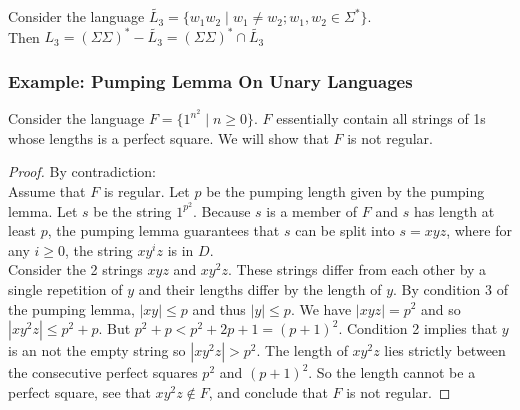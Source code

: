 \documentclass[11pt,a4paper]{article}
\begin{document}
\begin{example}
    Consider the language $\tilde{L_3}=\{w_1w_2\mid w_1\neq w_2;w_1,w_2\in \Sigma^*\}$. \\

    Then $L_3=(\Sigma\Sigma)^*-\tilde{L_3}=(\Sigma\Sigma)^*\cap \tilde{L_3}$
\end{example}

\subsubsection{Example: Pumping Lemma On Unary Languages}
\begin{example}
    Consider the language $F=\{1^{n^2}\mid n\geq 0\}$. $F$ essentially contain all strings of 1s whose lengths is a perfect square. We will show that $F$ is not regular. \\

    \begin{proof} By contradiction: \\

        Assume that $F$ is regular. Let $p$ be the pumping length given by the pumping lemma. Let $s$ be the string $1^{p^2}$.
        Because $s$ is a member of $F$ and $s$ has length at least $p$, the pumping lemma guarantees that $s$ can be split into $s=xyz$, where for any $i\geq 0$, the string $xy^iz$ is in $D$. \\

        Consider the 2 strings $xyz$ and $xy^2z$. These strings differ from each other by a single repetition of $y$ and their lengths differ by the length of $y$. By condition 3 of the pumping lemma, $|xy|\leq p$ and thus $|y|\leq p$.
        We have $|xyz|=p^2$ and so $|xy^2z|\leq p^2+p$. But $p^2+p<p^2+2p+1=(p+1)^2$. Condition 2 implies that $y$ is an not the empty string so $|xy^2z|>p^2$. The length of $xy^2z$ lies strictly between the consecutive perfect squares $p^2$ and $(p+1)^2$.
        So the length cannot be a perfect square, see that $xy^2z\notin F$, and conclude that $F$ is not regular.
        
    \end{proof}
\end{example}

\end{document}
